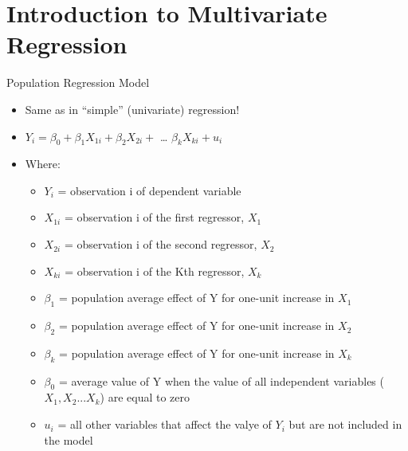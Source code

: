\documentclass[8pt,ignorenonframetext,dvipsnames]{beamer}
\providecommand{\tightlist}{%
  \setlength{\itemsep}{0pt}\setlength{\parskip}{0pt}}
\let\olditem\item
\renewcommand{\item}{%
  \olditem\vspace{4pt}
}
\begin{document}
\hypertarget{introduction-to-multivariate-regression}{%
\section{Introduction to Multivariate
Regression}\label{introduction-to-multivariate-regression}}

\begin{frame}{Population Regression Model}
\protect\hypertarget{population-regression-model}{}

\begin{itemize}
\tightlist
\item
  Same as in ``simple'' (univariate) regression!
\item
  \(Y_i = \beta_0 + \beta_1X_{1i} + \beta_2X_{2i} +\) \ldots{}
  \(\beta_kX_{ki} + u_i\)
\item
  Where:

  \begin{itemize}
  \tightlist
  \item
    \(Y_i\) = observation i of dependent variable
  \item
    \(X_{1i}\) = observation i of the first regressor, \(X_1\)
  \item
    \(X_{2i}\) = observation i of the second regressor, \(X_2\)
  \item
    \(X_{ki}\) = observation i of the Kth regressor, \(X_k\)
  \item
    \(\beta_1\) = population average effect of Y for one-unit increase
    in \(X_1\)
  \item
    \(\beta_2\) = population average effect of Y for one-unit increase
    in \(X_2\)
  \item
    \(\beta_k\) = population average effect of Y for one-unit increase
    in \(X_k\)
  \item
    \(\beta_0\) = average value of Y when the value of all independent
    variables (\(X_1, X_2 ...X_k\)) are equal to zero
  \item
    \(u_i\) = all other variables that affect the valye of \(Y_i\) but
    are not included in the model
  \end{itemize}
\end{itemize}

\end{frame}
\end{document}
